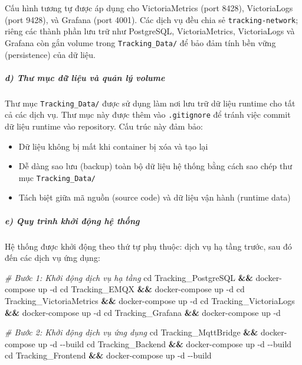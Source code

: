 \documentclass[13pt,a4paper]{extarticle}
\newenvironment{Shaded}{}{}
\newcommand{\AttributeTok}[1]{\textcolor[rgb]{0.49,0.56,0.16}{#1}}
\newcommand{\BuiltInTok}[1]{\textcolor[rgb]{0.00,0.50,0.00}{#1}}
\newcommand{\CommentTok}[1]{\textcolor[rgb]{0.38,0.63,0.69}{\textit{#1}}}
\newcommand{\ExtensionTok}[1]{#1}
\newcommand{\KeywordTok}[1]{\textcolor[rgb]{0.00,0.44,0.13}{\textbf{#1}}}
\newcommand{\NormalTok}[1]{#1}
\renewcommand{\\}{\thesislongtableorignewline\hline}%
\providecommand{\tightlist}{%
  \setlength{\itemsep}{0pt}\setlength{\parskip}{0pt}}
\begin{document}
Cấu hình tương tự được áp dụng cho VictoriaMetrics (port 8428),
VictoriaLogs (port 9428), và Grafana (port 4001). Các dịch vụ đều chia
sẻ \texttt{tracking-network}; riêng các thành phần lưu trữ như
PostgreSQL, VictoriaMetrics, VictoriaLogs và Grafana còn gắn volume
trong \texttt{Tracking\_Data/} để bảo đảm tính bền vững (persistence)
của dữ liệu.

\subparagraph{d) Thư mục dữ liệu và quản lý
volume}\label{d-thux1b0-mux1ee5c-dux1eef-liux1ec7u-vuxe0-quux1ea3n-luxfd-volume}

Thư mục \texttt{Tracking\_Data/} được sử dụng làm nơi lưu trữ dữ liệu
runtime cho tất cả các dịch vụ. Thư mục này được thêm vào
\texttt{.gitignore} để tránh việc commit dữ liệu runtime vào repository.
Cấu trúc này đảm bảo:

\begin{itemize}
\tightlist
\item
  Dữ liệu không bị mất khi container bị xóa và tạo lại
\item
  Dễ dàng sao lưu (backup) toàn bộ dữ liệu hệ thống bằng cách sao chép
  thư mục \texttt{Tracking\_Data/}
\item
  Tách biệt giữa mã nguồn (source code) và dữ liệu vận hành (runtime
  data)
\end{itemize}

\subparagraph{e) Quy trình khởi động hệ
thống}\label{e-quy-truxecnh-khux1edfi-ux111ux1ed9ng-hux1ec7-thux1ed1ng}

Hệ thống được khởi động theo thứ tự phụ thuộc: dịch vụ hạ tầng trước,
sau đó đến các dịch vụ ứng dụng:

\begin{Shaded}
\begin{Highlighting}[]
\CommentTok{\# Bước 1: Khởi động dịch vụ hạ tầng}
\BuiltInTok{cd}\NormalTok{ Tracking\_PostgreSQL }\KeywordTok{\&\&} \ExtensionTok{docker{-}compose}\NormalTok{ up }\AttributeTok{{-}d}
\BuiltInTok{cd}\NormalTok{ Tracking\_EMQX }\KeywordTok{\&\&} \ExtensionTok{docker{-}compose}\NormalTok{ up }\AttributeTok{{-}d}
\BuiltInTok{cd}\NormalTok{ Tracking\_VictoriaMetrics }\KeywordTok{\&\&} \ExtensionTok{docker{-}compose}\NormalTok{ up }\AttributeTok{{-}d}
\BuiltInTok{cd}\NormalTok{ Tracking\_VictoriaLogs }\KeywordTok{\&\&} \ExtensionTok{docker{-}compose}\NormalTok{ up }\AttributeTok{{-}d}
\BuiltInTok{cd}\NormalTok{ Tracking\_Grafana }\KeywordTok{\&\&} \ExtensionTok{docker{-}compose}\NormalTok{ up }\AttributeTok{{-}d}

\CommentTok{\# Bước 2: Khởi động dịch vụ ứng dụng}
\BuiltInTok{cd}\NormalTok{ Tracking\_MqttBridge }\KeywordTok{\&\&} \ExtensionTok{docker{-}compose}\NormalTok{ up }\AttributeTok{{-}d} \AttributeTok{{-}{-}build}
\BuiltInTok{cd}\NormalTok{ Tracking\_Backend }\KeywordTok{\&\&} \ExtensionTok{docker{-}compose}\NormalTok{ up }\AttributeTok{{-}d} \AttributeTok{{-}{-}build}
\BuiltInTok{cd}\NormalTok{ Tracking\_Frontend }\KeywordTok{\&\&} \ExtensionTok{docker{-}compose}\NormalTok{ up }\AttributeTok{{-}d} \AttributeTok{{-}{-}build}
\end{Highlighting}
\end{Shaded}
\end{document}
